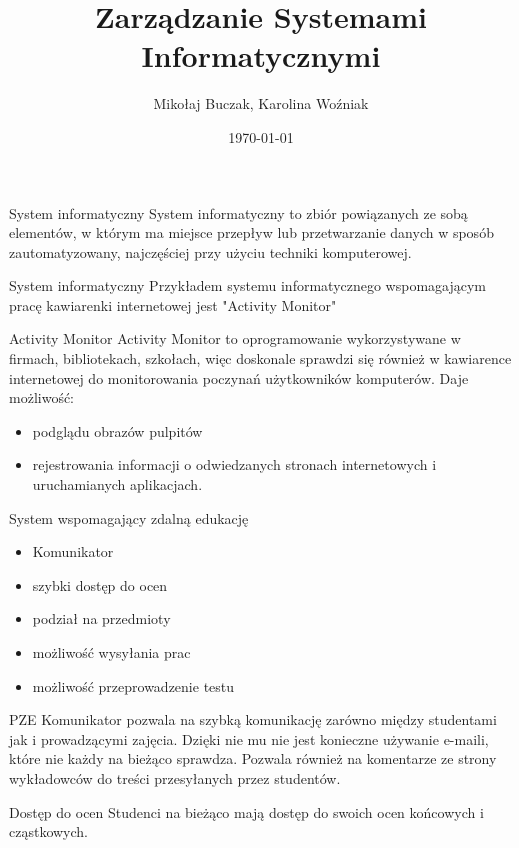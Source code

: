 \documentclass{beamer}
\title[M2.2]{Zarządzanie Systemami Informatycznymi}
\author{Mikołaj Buczak, Karolina Woźniak}
\institute{Politechnika Śląska}
\date{\today}
\begin{document}
\begin{frame}
  \titlepage
\end{frame}


\begin{frame}{System informatyczny}
     System informatyczny to zbiór powiązanych ze sobą elementów, w którym ma miejsce przepływ lub przetwarzanie danych w sposób zautomatyzowany, najczęściej przy użyciu techniki komputerowej.
\end{frame}

\begin{frame}{System informatyczny}
     Przykładem systemu informatycznego wspomagającym pracę kawiarenki internetowej jest "Activity Monitor"
\end{frame} 

\begin{frame}{Activity Monitor}
     Activity Monitor to oprogramowanie wykorzystywane w firmach, bibliotekach, szkołach, więc doskonale sprawdzi się również w kawiarence internetowej  do monitorowania poczynań użytkowników komputerów. Daje możliwość:
     \begin{itemize}
         \item podglądu obrazów pulpitów
         \item rejestrowania informacji o odwiedzanych stronach internetowych i uruchamianych aplikacjach.
     \end{itemize}
    
\end{frame}

\begin{frame}{System wspomagający zdalną edukację}
    \begin{itemize}
        \item Komunikator
        \item szybki dostęp do ocen
        \item podział na przedmioty
        \item możliwość wysyłania prac
        \item możliwość przeprowadzenie testu
    \end{itemize}
\end{frame}

\begin{frame}{PZE}
    Komunikator pozwala na szybką komunikację zarówno między studentami jak i prowadzącymi zajęcia. Dzięki nie mu nie jest konieczne używanie e-maili, które nie każdy na bieżąco sprawdza. Pozwala również na komentarze ze strony wykładowców do treści przesyłanych przez studentów.
\end{frame}
\begin{frame}{Dostęp do ocen}
    Studenci na bieżąco mają dostęp do swoich ocen końcowych i cząstkowych.
\end{frame}
\end{document}
